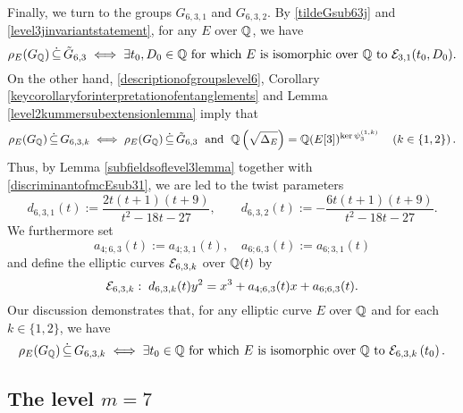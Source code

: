 Finally, we turn to the groups $G_{6,3,1}$ and $G_{6,3,2}$. By \eqref{tildeGsub63j} and \eqref{level3jinvariantstatement}, for any $E$ over $\mathbb{Q}$, we have
\[
\rho_{E}(G_{\mathbb{Q}}) \, \dot\subseteq \, \tilde{G}_{6,3} \; \Longleftrightarrow \; \exists t_0, D_0 \in \mathbb{Q} \text{ for which $E$ is isomorphic over $\mathbb{Q}$ to } \mathcal{E}_{3,1}(t_0,D_0).
\]
On the other hand, \eqref{descriptionofgroupslevel6}, Corollary \ref{keycorollaryforinterpretationofentanglements} and Lemma \ref{level2kummersubextensionlemma} imply that
\[
\rho_{E}(G_{\mathbb{Q}}) \, \dot\subseteq \, G_{6,3,k} \; \Longleftrightarrow \; \rho_{E}(G_{\mathbb{Q}}) \, \dot\subseteq \, \tilde{G}_{6,3} \; \text{ and } \; \mathbb{Q}\left( \sqrt{\Delta_E} \right) = \mathbb{Q}(E[3])^{\ker \psi_3^{(1,k)}} \quad \left( k \in \{ 1, 2 \} \right).
\]
Thus, by Lemma \ref{subfieldsoflevel3lemma} together with \eqref{discriminantofmcEsub31}, we are led to the twist parameters
\[
d_{6,3,1}(t) := \frac{2t(t+1)(t+9)}{t^2 - 18t - 27}, \quad\quad d_{6,3,2}(t) := - \frac{6t(t+1)(t+9)}{t^2 - 18t - 27}.
\]
We furthermore set
\[
a_{4;6,3}(t) := a_{4;3,1}(t), \quad a_{6;6,3}(t) := a_{6;3,1}(t)
\]
and define the elliptic curves $\mathcal{E}_{6,3,k}$ over $\mathbb{Q}(t)$ by
\[
\mathcal{E}_{6,3,k} : \; d_{6,3,k}(t) y^2 = x^3 + a_{4;6,3}(t) x + a_{6;6,3}(t).
\]
Our discussion demonstrates that, for any elliptic curve $E$ over $\mathbb{Q}$ and for each $k \in \{1, 2 \}$, we have
\[
\rho_{E}(G_{\mathbb{Q}}) \, \dot\subseteq \, G_{6,3,k} \; \Longleftrightarrow \; \exists t_0 \in \mathbb{Q} \text{ for which $E$ is isomorphic over $\mathbb{Q}$ to } \mathcal{E}_{6,3,k}\left( t_0 \right).
\]

\medskip

\subsection{The level \texorpdfstring{$m = 7$}.}


